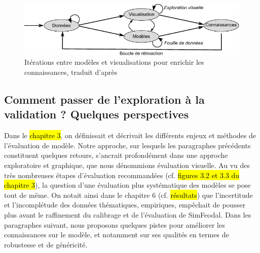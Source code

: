 \begin{figure}[H]
	\centering
	\includegraphics[width=\linewidth]{img/schema_keim.pdf}
	
	\caption{Itérations entre modèles et visualisations pour enrichir les connaissances, traduit d'après \textcite[fig.~1, p.~156]{keim_visual_2008}}
	\label{fig:schema-va}
\end{figure}


\subsection{Comment passer de l'exploration à la validation ? Quelques perspectives}

Dans le \hl{chapitre 3}, on définissait et décrivait les différents enjeux et méthodes de l'évaluation de modèle.
Notre approche, sur lesquels les paragraphes précédents constituent quelques retours, s'ancrait profondément dans une approche exploratoire et graphique, que nous dénommions \og évaluation visuelle\fg{}.
Au vu des très nombreuses étapes d'évaluation recommandées (cf. \hl{figures 3.2 et 3.3 du chapitre 3}), la question d'une évaluation plus systématique des modèles se pose tout de même.
On notait ainsi dans le chapitre 6 (cf. \hl{résultats}) que l'incertitude et l'incomplétude des données thématiques, empiriques, empêchait de pousser plus avant le raffinement du calibrage et de l'évaluation de SimFeodal.
Dans les paragraphes suivant, nous proposons quelques pistes pour améliorer les connaissances sur le modèle, et notamment sur ses qualités en termes de robustesse et de généricité.

